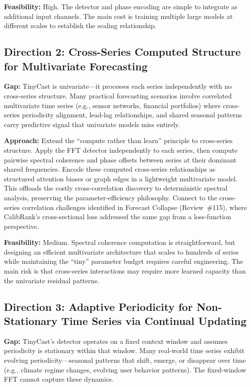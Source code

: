 \documentclass[11pt,a4paper]{article}
\begin{document}
\textbf{Feasibility:} High. The detector and phase encoding are simple to integrate as additional input channels. The main cost is training multiple large models at different scales to establish the scaling relationship.

\subsection{Direction 2: Cross-Series Computed Structure for Multivariate Forecasting}
\textbf{Gap:} TinyCast is univariate---it processes each series independently with no cross-series structure. Many practical forecasting scenarios involve correlated multivariate time series (e.g., sensor networks, financial portfolios) where cross-series periodicity alignment, lead-lag relationships, and shared seasonal patterns carry predictive signal that univariate models miss entirely.

\textbf{Approach:} Extend the ``compute rather than learn'' principle to cross-series structure. Apply the FFT detector independently to each series, then compute pairwise spectral coherence and phase offsets between series at their dominant shared frequencies. Encode these computed cross-series relationships as structured attention biases or graph edges in a lightweight multivariate model. This offloads the costly cross-correlation discovery to deterministic spectral analysis, preserving the parameter-efficiency philosophy. Connect to the cross-series correlation challenges identified in Forecast Collapse (Review~\#115), where CalibRank's cross-sectional loss addressed the same gap from a loss-function perspective.

\textbf{Feasibility:} Medium. Spectral coherence computation is straightforward, but designing an efficient multivariate architecture that scales to hundreds of series while maintaining the ``tiny'' parameter budget requires careful engineering. The main risk is that cross-series interactions may require more learned capacity than the univariate residual patterns.

\subsection{Direction 3: Adaptive Periodicity for Non-Stationary Time Series via Continual Updating}
\textbf{Gap:} TinyCast's detector operates on a fixed context window and assumes periodicity is stationary within that window. Many real-world time series exhibit evolving periodicity---seasonal patterns that shift, emerge, or disappear over time (e.g., climate regime changes, evolving user behavior patterns). The fixed-window FFT cannot capture these dynamics.
\end{document}
